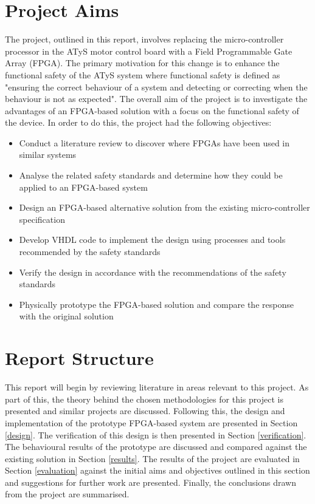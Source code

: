 \section{Project Aims}

The project, outlined in this report, involves replacing the micro-controller processor in the ATyS motor control board with a Field Programmable Gate Array (FPGA). The primary motivation for this change is to enhance the functional safety of the ATyS system where functional safety is defined as "ensuring the correct behaviour of a system and detecting or correcting when the behaviour is not as expected"\cite{Jeppesen, IECfunctionalsafety}. 
The overall aim of the project is to investigate the advantages of an FPGA-based solution with a focus on the functional safety of the device. In order to do this, the project had the following objectives:
\begin{itemize}
  \item Conduct a literature review to discover where FPGAs have been used in similar systems
  \item Analyse the related safety standards and determine how they could be applied to an FPGA-based system
  \item Design an FPGA-based alternative solution from the existing micro-controller specification
  \item Develop VHDL code to implement the design using processes and tools recommended by the safety standards  
  \item Verify the design in accordance with the recommendations of the safety standards
  \item Physically prototype the FPGA-based solution and compare the response with the original solution
\end{itemize}



\section{Report Structure}
This report will begin by reviewing literature in areas relevant to this project. As part of this, the theory behind the chosen methodologies for this project is presented and similar projects are discussed. Following this, the design and implementation of the prototype FPGA-based system are presented in Section \ref{design}. The verification of this design is then presented in Section \ref{verification}. The behavioural results of the prototype are discussed and compared against the existing solution in Section \ref{results}. The results of the project are evaluated in Section \ref{evaluation} against the initial aims and objectives outlined in this section and suggestions for further work are presented. Finally, the conclusions drawn from the project are summarised.
